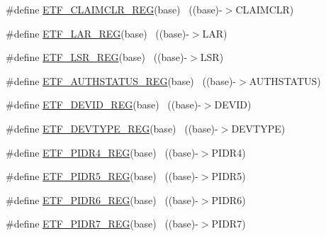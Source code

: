 \begin{DoxyCompactItemize}
\item 
\#define \hyperlink{group___e_t_f___register___accessor___macros_ga312f63051726e4353cc7327885a2944c}{E\+T\+F\+\_\+\+C\+L\+A\+I\+M\+C\+L\+R\+\_\+\+R\+EG}(base)                                  ~((base)-\/$>$C\+L\+A\+I\+M\+C\+LR)
\item 
\#define \hyperlink{group___e_t_f___register___accessor___macros_gad3ed858ce6cb420afbb17f92ccd66aa1}{E\+T\+F\+\_\+\+L\+A\+R\+\_\+\+R\+EG}(base)                                            ~((base)-\/$>$L\+AR)
\item 
\#define \hyperlink{group___e_t_f___register___accessor___macros_gab11d6e472c1d965bcf67965110dfdc3d}{E\+T\+F\+\_\+\+L\+S\+R\+\_\+\+R\+EG}(base)                                            ~((base)-\/$>$L\+SR)
\item 
\#define \hyperlink{group___e_t_f___register___accessor___macros_ga9f4398ed01d6b173c9dcb969e6188d5e}{E\+T\+F\+\_\+\+A\+U\+T\+H\+S\+T\+A\+T\+U\+S\+\_\+\+R\+EG}(base)                              ~((base)-\/$>$A\+U\+T\+H\+S\+T\+A\+T\+US)
\item 
\#define \hyperlink{group___e_t_f___register___accessor___macros_ga67993c3d2a89be881d7cf6e9376262dd}{E\+T\+F\+\_\+\+D\+E\+V\+I\+D\+\_\+\+R\+EG}(base)                                        ~((base)-\/$>$D\+E\+V\+ID)
\item 
\#define \hyperlink{group___e_t_f___register___accessor___macros_ga4a325b20038d673fb3ce3315d92447c8}{E\+T\+F\+\_\+\+D\+E\+V\+T\+Y\+P\+E\+\_\+\+R\+EG}(base)                                    ~((base)-\/$>$D\+E\+V\+T\+Y\+PE)
\item 
\#define \hyperlink{group___e_t_f___register___accessor___macros_gaa7e3cd7e6ebe630d04469253ef74edff}{E\+T\+F\+\_\+\+P\+I\+D\+R4\+\_\+\+R\+EG}(base)                                        ~((base)-\/$>$P\+I\+D\+R4)
\item 
\#define \hyperlink{group___e_t_f___register___accessor___macros_gad07bd35743dda4c65ffc83da3c02c1c8}{E\+T\+F\+\_\+\+P\+I\+D\+R5\+\_\+\+R\+EG}(base)                                        ~((base)-\/$>$P\+I\+D\+R5)
\item 
\#define \hyperlink{group___e_t_f___register___accessor___macros_gadb758d0aa38d644a432e5dd9978d212f}{E\+T\+F\+\_\+\+P\+I\+D\+R6\+\_\+\+R\+EG}(base)                                        ~((base)-\/$>$P\+I\+D\+R6)
\item 
\#define \hyperlink{group___e_t_f___register___accessor___macros_ga6091662320901cb89249b5e681300fd9}{E\+T\+F\+\_\+\+P\+I\+D\+R7\+\_\+\+R\+EG}(base)                                        ~((base)-\/$>$P\+I\+D\+R7)

\end{DoxyCompactItemize}
